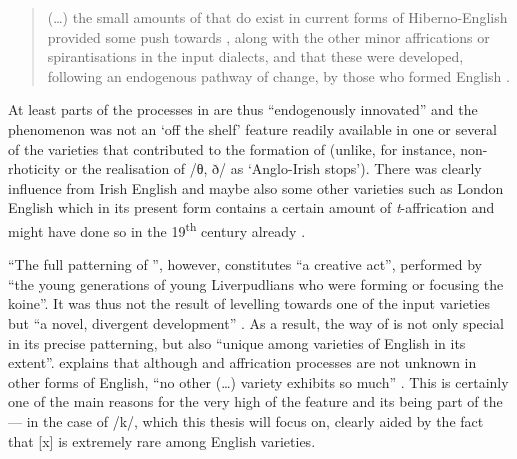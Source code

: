 	\begin{quote}
		(\ldots) the small amounts of   that do exist in current forms of Hiberno-English provided some push towards , along with the other minor affrications or spirantisations in the input dialects, and that these were developed, following an endogenous pathway of change, by those who formed  English \citeyearpar[131]{honeybone2007}.
	\end{quote}

At least parts of the  processes in  are thus ``endogenously innovated'' \citep[130]{honeybone2007} and the phenomenon was not an `off the shelf' feature readily available in one or several of the varieties that contributed to the formation of  (unlike, for instance, non-rhoticity or the realisation of /θ, ð/ as `Anglo-Irish stops').
There was clearly influence from Irish English and maybe also some other varieties such as London English which in its present form contains a certain amount of \emph{t}-affrication and might have done so in the 19\textsuperscript{th} century already \citeyearpar[cf.][132]{honeybone2007}.

``The full patterning of  '', however, constitutes ``a creative act'', performed by ``the young generations of young Liverpudlians who were forming or focusing the koine''.
It was thus not the result of levelling towards one of the input varieties but ``a novel, divergent development'' \citeyearpar[132]{honeybone2007}.
As a result, the  way of  is not only special in its precise patterning, but also ``unique among varieties of English in its extent''.
\citeauthor{honeybone2007} explains that although  and affrication processes are not unknown in other forms of English, ``no other (\ldots) variety exhibits so much'' \citeyearpar[130]{honeybone2007}.
This is certainly one of the main reasons for the very high  of the feature and its being part of the   --- in the case of /k/, which this thesis will focus on, clearly aided by the fact that [x] is extremely rare among English varieties.

